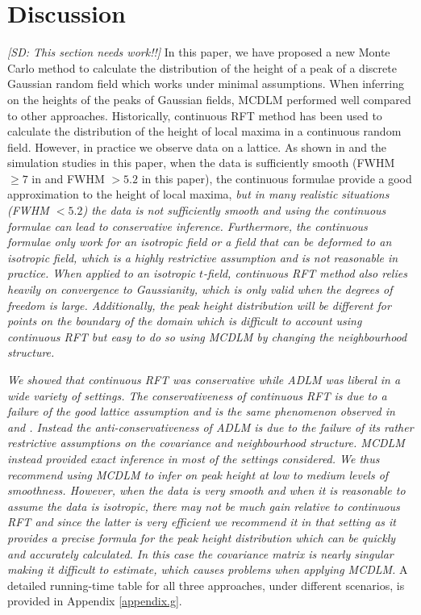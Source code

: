 \documentclass{article}
\newcommand{\sdcom}[1]{\textit{\color{red} [SD: #1]}}
\newcommand{\nt}[1]{\textit{\color{red} #1}}
\begin{document}
\section{Discussion}
\label{sec6}
\sdcom{This section needs work!!}
In this paper, we have proposed a new Monte Carlo method to calculate the distribution of the height of a peak of a discrete Gaussian random field which works under minimal assumptions. When inferring on the heights of the peaks of Gaussian fields, MCDLM performed well compared to other approaches. Historically, continuous RFT method has been used to calculate the distribution of the height of local maxima in a continuous random field. However, in practice we observe data on a lattice. As shown in \cite{schwartzman2019peak} and the simulation studies in this paper, when the data is sufficiently smooth (FWHM $\ge 7$ in \cite{schwartzman2019peak} and FWHM $> 5.2$ in this paper), the continuous formulae provide a good approximation to the height of local maxima, \nt{but in many realistic situations (FWHM $< 5.2$) the data is not sufficiently smooth and using the continuous formulae can lead to conservative inference. Furthermore, the continuous formulae only work for an isotropic field or a field that can be deformed to an isotropic field, which is a highly restrictive assumption and is not reasonable in practice. When applied to an isotropic $t$-field, continuous RFT method also relies heavily on convergence to Gaussianity, which is only valid when the degrees of freedom is large. Additionally, the peak height distribution will be different for points on the boundary of the domain which is difficult to account using continuous RFT but easy to do so using MCDLM by changing the neighbourhood structure. }

\nt{We showed that continuous RFT was conservative while ADLM was liberal in a wide variety of settings. The conservativeness of continuous RFT is due to a failure of the good lattice assumption and is the same phenomenon observed in \cite{telschow2023riding} and \cite{davenport2023robust}. Instead the anti-conservativeness of ADLM is due to the failure of its rather restrictive assumptions on the covariance and neighbourhood structure. MCDLM instead provided exact inference in most of the settings considered. We thus recommend using MCDLM to infer on peak height at low to medium levels of smoothness. However, when the data is very smooth and when it is reasonable to assume the data is isotropic, there may not be much gain relative to continuous RFT and since the latter is very efficient we recommend it in that setting as it provides a precise formula for the peak height distribution which can be quickly and accurately calculated. In this case the covariance matrix is nearly singular making it difficult to estimate, which causes problems when applying MCDLM.} A detailed running-time table for all three approaches, under different scenarios, is provided in Appendix \ref{appendix.g}.
\end{document}
